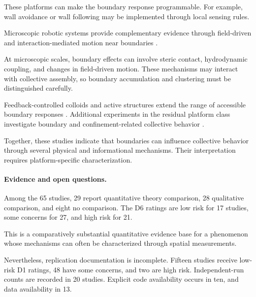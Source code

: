 These platforms can
make the boundary
response programmable.
For example,
wall avoidance
or wall following
may be implemented
through local
sensing rules.



Microscopic robotic
systems provide
complementary evidence
through field-driven
and interaction-mediated
motion near boundaries
\cite{Calabr2026interactiondrivena,Yigit2019programmablecollect,Das2023optoelectronictraje,Liu2023swarmingmultifuncti,Wang2026reconfigurableassem,Baker2019shapeprogrammed3d,Gardi2022microrobotcollectiv,Ahmed2021bioinspiredacousto,Yan2024programmingstructur,Desgranges2023microswimmersunder,Ceron2023programmableselfor,Fonseca2022navigationofultras,Ceron2026fluidictorqueenabl,Dong2019collectiveformation}.

At microscopic scales,
boundary effects can
involve steric contact,
hydrodynamic coupling,
and changes in
field-driven motion.
These mechanisms
may interact with
collective assembly,
so boundary accumulation
and clustering
must be distinguished
carefully.

Feedback-controlled
colloids and active
structures extend
the range of
accessible boundary
responses
\cite{Chen2024synchronousandfull,Zhang2026noiseenhancedtempo}.
Additional experiments
in the residual
platform class
investigate boundary
and confinement-related
collective behavior
\cite{Jia2014experimentalimpleme,Boudet2025effectsofboundarie,Das2025roleofkinematicco,Nilles2019ahardwareandsoftw}.

Together, these studies
indicate that boundaries
can influence collective
behavior through several
physical and informational
mechanisms. Their
interpretation requires
platform-specific
characterization.

\paragraph*{Evidence and open questions.}

Among the 65 studies,
29 report quantitative
theory comparison,
28 qualitative comparison,
and eight no comparison.
The D6 ratings are
low risk for 17 studies,
some concerns for 27,
and high risk for 21.

This is a comparatively
substantial quantitative
evidence base for a
phenomenon whose
mechanisms can often
be characterized
through spatial
measurements.

Nevertheless, replication
documentation is incomplete.
Fifteen studies receive
low-risk D1 ratings,
48 have some concerns,
and two are high risk.
Independent-run counts
are recorded in 20 studies.
Explicit code availability
occurs in ten,
and data availability
in 13.







